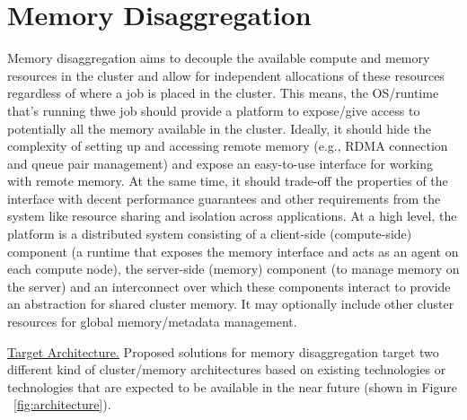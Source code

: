 \section{Memory Disaggregation}

Memory disaggregation aims to decouple the available compute 
and memory resources in the cluster and allow for independent 
allocations of these resources regardless of where a job 
is placed in the cluster. This means, the OS/runtime 
that's running thwe job should provide a platform to 
expose/give access to potentially all the memory 
available in the cluster. Ideally, it should hide the 
complexity of setting up and accessing remote memory (e.g., RDMA 
connection and queue pair management) and expose an
easy-to-use interface for working with remote memory.
At the same time, it should trade-off the properties 
of the interface with decent performance guarantees 
and other requirements from the system like resource 
sharing and isolation across applications. At a high 
level, the platform is a distributed system consisting 
of a client-side (compute-side) component (a runtime 
that exposes the memory interface and acts as an agent 
on each compute node), the server-side (memory) component 
(to manage memory on the server) and an 
interconnect over which these components 
interact to provide an abstraction for shared cluster memory.
It may optionally include other cluster resources for 
global memory/metadata management.

\vspace{3pt}
\noindent \uline{Target Architecture.}
Proposed solutions for memory disaggregation target two 
different kind of cluster/memory architectures based on
existing technologies or technologies that are expected
to be available in the near future (shown in 
Figure ~\ref{fig:architecture}).

